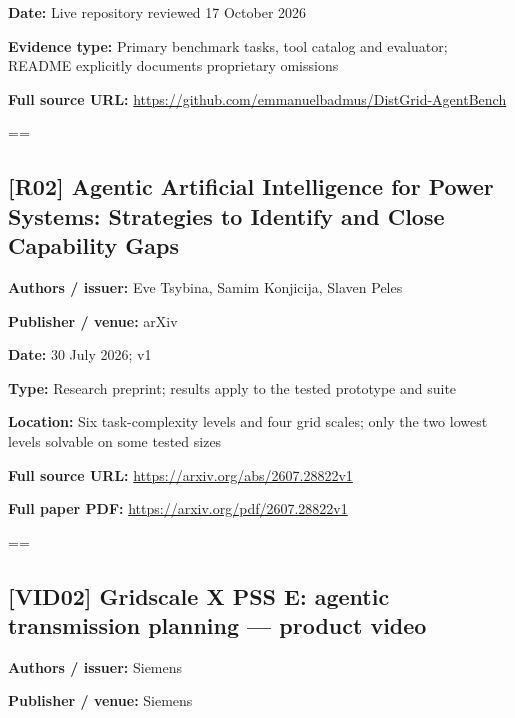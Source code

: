 \documentclass[10pt,letterpaper]{article}
\begin{document}
\textbf{Date:} Live repository reviewed 17 October 2026\par
\textbf{Evidence type:} Primary benchmark tasks, tool catalog and evaluator; README explicitly documents proprietary omissions\par
\textbf{Full source URL:} \href{https://github.com/emmanuelbadmus/DistGrid-AgentBench}{\small\ttfamily https:/\allowbreak{}/\allowbreak{}github.\allowbreak{}com/\allowbreak{}emmanuelbadmus/\allowbreak{}DistGrid-\allowbreak{}AgentBench}\par
\egroup\par\noindent\box\readingEntry\par\medskip
\setbox\readingEntry=\vbox\bgroup\hsize=\linewidth\subsection*{[R02] Agentic Artificial Intelligence for Power Systems: Strategies to Identify and Close Capability Gaps}
\textbf{Authors / issuer:} Eve Tsybina, Samim Konjicija, Slaven Peles\par
\textbf{Publisher / venue:} arXiv\par
\textbf{Date:} 30 July 2026; v1\par
\textbf{Type:} Research preprint; results apply to the tested prototype and suite\par
\textbf{Location:} Six task-complexity levels and four grid scales; only the two lowest levels solvable on some tested sizes\par
\textbf{Full source URL:} \href{https://arxiv.org/abs/2607.28822v1}{\small\ttfamily https:/\allowbreak{}/\allowbreak{}arxiv.\allowbreak{}org/\allowbreak{}abs/\allowbreak{}2607.\allowbreak{}28822v1}\par
\textbf{Full paper PDF:} \href{https://arxiv.org/pdf/2607.28822v1}{\small\ttfamily https:/\allowbreak{}/\allowbreak{}arxiv.\allowbreak{}org/\allowbreak{}pdf/\allowbreak{}2607.\allowbreak{}28822v1}\par
\egroup\par\noindent\box\readingEntry\par\medskip
\setbox\readingEntry=\vbox\bgroup\hsize=\linewidth\subsection*{[VID02] Gridscale X PSS E: agentic transmission planning --- product video}
\textbf{Authors / issuer:} Siemens\par
\textbf{Publisher / venue:} Siemens\par
\end{document}
